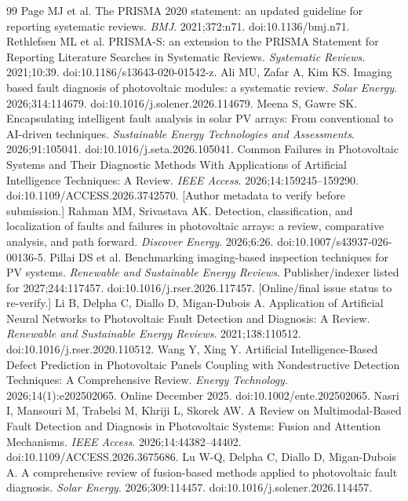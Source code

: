 \documentclass[10pt,a4paper]{article}
\begin{document}
\begin{thebibliography}{99}\small\setlength{\itemsep}{1pt}
 Page MJ et al. The PRISMA 2020 statement: an updated guideline for reporting systematic reviews. \emph{BMJ}. 2021;372:n71. doi:10.1136/bmj.n71.
 Rethlefsen ML et al. PRISMA-S: an extension to the PRISMA Statement for Reporting Literature Searches in Systematic Reviews. \emph{Systematic Reviews}. 2021;10:39. doi:10.1186/s13643-020-01542-z.
 Ali MU, Zafar A, Kim KS. Imaging based fault diagnosis of photovoltaic modules: a systematic review. \emph{Solar Energy}. 2026;314:114679. doi:10.1016/j.solener.2026.114679.
 Meena S, Gawre SK. Encapsulating intelligent fault analysis in solar PV arrays: From conventional to AI-driven techniques. \emph{Sustainable Energy Technologies and Assessments}. 2026;91:105041. doi:10.1016/j.seta.2026.105041.
 Common Failures in Photovoltaic Systems and Their Diagnostic Methods With Applications of Artificial Intelligence Techniques: A Review. \emph{IEEE Access}. 2026;14:159245--159290. doi:10.1109/ACCESS.2026.3742570. [Author metadata to verify before submission.]
 Rahman MM, Srivastava AK. Detection, classification, and localization of faults and failures in photovoltaic arrays: a review, comparative analysis, and path forward. \emph{Discover Energy}. 2026;6:26. doi:10.1007/s43937-026-00136-5.
 Pillai DS et al. Benchmarking imaging-based inspection techniques for PV systems. \emph{Renewable and Sustainable Energy Reviews}. Publisher/indexer listed for 2027;244:117457. doi:10.1016/j.rser.2026.117457. [Online/final issue status to re-verify.]
 Li B, Delpha C, Diallo D, Migan-Dubois A. Application of Artificial Neural Networks to Photovoltaic Fault Detection and Diagnosis: A Review. \emph{Renewable and Sustainable Energy Reviews}. 2021;138:110512. doi:10.1016/j.rser.2020.110512.
 Wang Y, Xing Y. Artificial Intelligence-Based Defect Prediction in Photovoltaic Panels Coupling with Nondestructive Detection Techniques: A Comprehensive Review. \emph{Energy Technology}. 2026;14(1):e202502065. Online December 2025. doi:10.1002/ente.202502065.
 Nasri I, Mansouri M, Trabelsi M, Khriji L, Skorek AW. A Review on Multimodal-Based Fault Detection and Diagnosis in Photovoltaic Systems: Fusion and Attention Mechanisms. \emph{IEEE Access}. 2026;14:44382--44402. doi:10.1109/ACCESS.2026.3675686.
 Lu W-Q, Delpha C, Diallo D, Migan-Dubois A. A comprehensive review of fusion-based methods applied to photovoltaic fault diagnosis. \emph{Solar Energy}. 2026;309:114457. doi:10.1016/j.solener.2026.114457.

\end{thebibliography}
\end{document}
